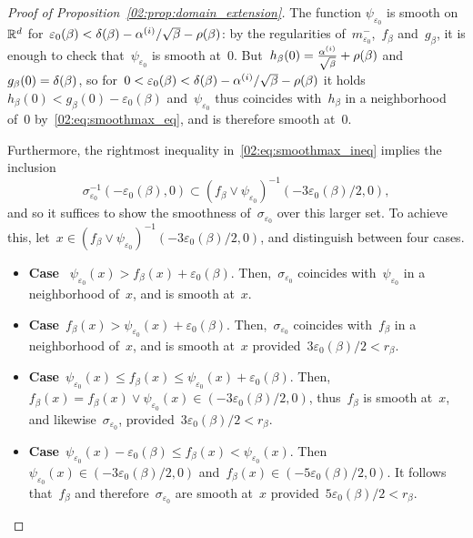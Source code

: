 \begin{proof}[Proof of Proposition~\ref{02:prop:domain_extension}]
        The function $\psi_{\varepsilon_0}$ is smooth on~$\mathbb{R}^d$ for~$\varepsilon_0(\beta)<\delta(\beta)-\alpha^{(i)}/\sqrt\beta -\rho(\beta)$: by the regularities of~$m_{\varepsilon_0}^{-}$,~$f_\beta$ and~$g_\beta$, it is enough to check that~$\psi_{\varepsilon_0}$ is smooth at~$0$. But~$h_\beta(0) = \frac{\alpha^{(i)}}{\sqrt\beta}+\rho(\beta)$ and~$g_\beta(0)=\delta(\beta)$, so for~$0<\varepsilon_0(\beta)<\delta(\beta)-\alpha^{(i)}/\sqrt\beta -\rho(\beta)$ it holds $h_\beta(0)<g_\beta(0)-\varepsilon_0(\beta)$ and~$\psi_{\varepsilon_0}$ thus coincides with~$h_\beta$ in a neighborhood of~$0$ by~\eqref{02:eq:smoothmax_eq}, and is therefore smooth at~$0$.

        Furthermore, the rightmost inequality in~\eqref{02:eq:smoothmax_ineq} implies the inclusion $${\sigma_{\varepsilon_0}^{-1}(-\varepsilon_0(\beta),0)\subset (f_\beta\lor \psi_{\varepsilon_0})^{-1}(-3\varepsilon_0(\beta)/2,0)},$$ and so it suffices to show the smoothness of~$\sigma_{\varepsilon_0}$ over this larger set. To achieve this, let~$x\in (f_\beta\lor \psi_{\varepsilon_0})^{-1}(-3\varepsilon_0(\beta)/2,0)$, and distinguish between four cases.
        \begin{itemize}
            \item{{\bf Case }~$\psi_{\varepsilon_0}(x)>f_\beta(x)+\varepsilon_0(\beta)$. Then,~$\sigma_{\varepsilon_0}$ coincides with~$\psi_{\varepsilon_0}$ in a neighborhood of~$x$, and is smooth at~$x$.}
            \item{{\bf Case}~$f_\beta(x)>\psi_{\varepsilon_0}(x)+\varepsilon_0(\beta)$. Then,~$\sigma_{\varepsilon_0}$ coincides with~$f_\beta$ in a neighborhood of~$x$, and is smooth at~$x$ provided~$3\varepsilon_0(\beta)/2<r_\beta$.}
            \item{{\bf Case}~$\psi_{\varepsilon_0}(x)\leq f_\beta(x)\leq \psi_{\varepsilon_0}(x) + \varepsilon_0(\beta)$. Then,~$f_\beta(x)=f_\beta(x)\lor \psi_{\varepsilon_0}(x) \in\left( -3\varepsilon_0(\beta)/2,0\right)$, thus~$f_\beta$ is smooth at~$x$, and likewise~$\sigma_{\varepsilon_0}$, provided~$3\varepsilon_0(\beta)/2<r_\beta$.}
            \item{{\bf Case}~$\psi_{\varepsilon_0}(x)-\varepsilon_0(\beta) \leq f_\beta(x) < \psi_{\varepsilon_0}(x)$. Then~$\psi_{\varepsilon_0}(x)\in\left(-3\varepsilon_0(\beta)/2,0\right)$ and~$f_\beta(x)\in \left(-5\varepsilon_0(\beta)/2,0\right)$. It follows that~$f_\beta$ and therefore~$\sigma_{\varepsilon_0}$ are smooth at~$x$ provided~$5\varepsilon_0(\beta)/2 < r_\beta$. }
        \end{itemize}

\end{proof}
